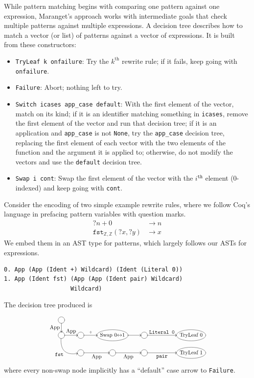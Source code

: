 While pattern matching begins with comparing one pattern against one expression, Maranget's approach works with intermediate goals that check multiple patterns against multiple expressions.
A decision tree describes how to match a vector (or list) of patterns against a vector of expressions.
It is built from these constructors:
\begin{itemize}
  \item \texttt{TryLeaf k onfailure}: Try the $k^\text{th}$ rewrite rule; if it fails, keep going with \texttt{onfailure}.
  \item \texttt{Failure}: Abort; nothing left to try.
  \item \texttt{Switch icases app\_case default}:
    With the first element of the vector, match on its kind; if it is an identifier matching something in \texttt{icases}, remove the first element of the vector and run that decision tree; if it is an application and \texttt{app\_case} is not \texttt{None}, try the \texttt{app\_case} decision tree, replacing the first element of each vector with the two elements of the function and the argument it is applied to; otherwise, do not modify the vectors and use the \texttt{default} decision tree.
  \item \texttt{Swap i cont}: Swap the first element of the vector with the $i^\texttt{th}$ element (0-indexed) and keep going with \texttt{cont}.
\end{itemize}

Consider the encoding of two simple example rewrite rules, where we follow Coq's \Ltac{} language in prefacing pattern variables with question marks.
\begin{align*}
  ?n + 0 & \to n \\
  \texttt{fst}_{\mathbb{Z},\mathbb{Z}}(?x, ?y) & \to x
\end{align*}
We embed them in an AST type for patterns, which largely follows our ASTs for expressions.
\begin{verbatim}
0. App (App (Ident +) Wildcard) (Ident (Literal 0))
1. App (Ident fst) (App (App (Ident pair) Wildcard)
                   Wildcard)
\end{verbatim}
The decision tree produced is \label{sec:compiled-pattern}
\[\resizebox{230px}{!}{\xymatrix@R-1pc{
  *++[o][F-]\txt{} \ar[d]_{\txt{App}} \\
  *++[o][F-]\txt{} \ar[r]^-{\txt{App}} \ar@/_1.5pc/[dr]_{\txt{\texttt{fst}}} & *++[o][F-]\txt{} \ar[r]^-{+} & *++[o][F-]\txt{Swap 0$\leftrightarrow$1} \ar[r] & *++[o][F-]\txt{} \ar[rr]^-{\txt{\texttt{Literal~0}}} && *++[o][F-]\txt{TryLeaf 0} \\
  & *++[o][F-]\txt{} \ar[r]_-{\txt{App}} & *++[o][F-]\txt{} \ar[r]_-{\txt{App}} & *++[o][F-]\txt{} \ar[rr]_-{\txt{\texttt{pair}}} && *++[o][F-]\txt{TryLeaf 1}
}}\]
\noindent where every non-swap node implicitly has a ``default'' case arrow to \texttt{Failure}.


